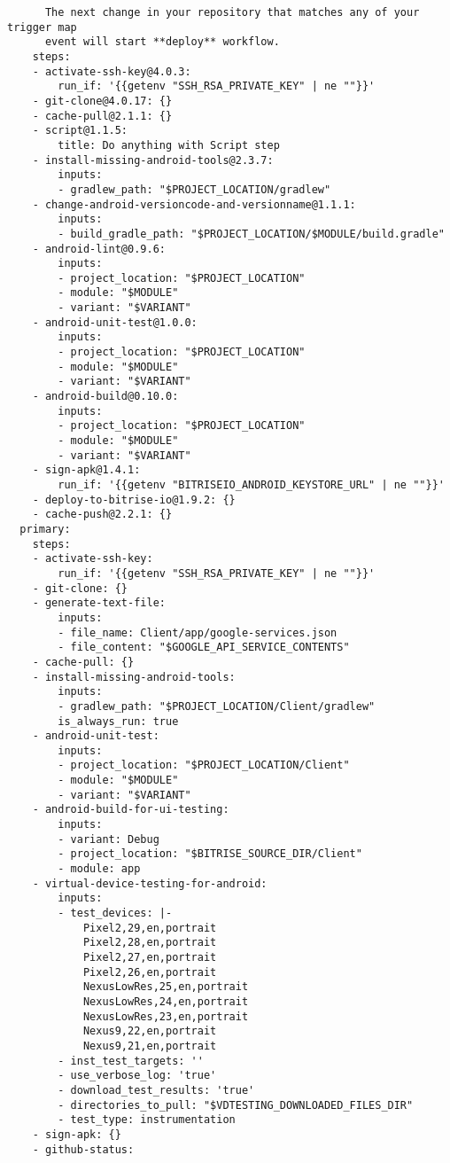 \begin{verbatim}
      The next change in your repository that matches any of your trigger map
      event will start **deploy** workflow.
    steps:
    - activate-ssh-key@4.0.3:
        run_if: '{{getenv "SSH_RSA_PRIVATE_KEY" | ne ""}}'
    - git-clone@4.0.17: {}
    - cache-pull@2.1.1: {}
    - script@1.1.5:
        title: Do anything with Script step
    - install-missing-android-tools@2.3.7:
        inputs:
        - gradlew_path: "$PROJECT_LOCATION/gradlew"
    - change-android-versioncode-and-versionname@1.1.1:
        inputs:
        - build_gradle_path: "$PROJECT_LOCATION/$MODULE/build.gradle"
    - android-lint@0.9.6:
        inputs:
        - project_location: "$PROJECT_LOCATION"
        - module: "$MODULE"
        - variant: "$VARIANT"
    - android-unit-test@1.0.0:
        inputs:
        - project_location: "$PROJECT_LOCATION"
        - module: "$MODULE"
        - variant: "$VARIANT"
    - android-build@0.10.0:
        inputs:
        - project_location: "$PROJECT_LOCATION"
        - module: "$MODULE"
        - variant: "$VARIANT"
    - sign-apk@1.4.1:
        run_if: '{{getenv "BITRISEIO_ANDROID_KEYSTORE_URL" | ne ""}}'
    - deploy-to-bitrise-io@1.9.2: {}
    - cache-push@2.2.1: {}
  primary:
    steps:
    - activate-ssh-key:
        run_if: '{{getenv "SSH_RSA_PRIVATE_KEY" | ne ""}}'
    - git-clone: {}
    - generate-text-file:
        inputs:
        - file_name: Client/app/google-services.json
        - file_content: "$GOOGLE_API_SERVICE_CONTENTS"
    - cache-pull: {}
    - install-missing-android-tools:
        inputs:
        - gradlew_path: "$PROJECT_LOCATION/Client/gradlew"
        is_always_run: true
    - android-unit-test:
        inputs:
        - project_location: "$PROJECT_LOCATION/Client"
        - module: "$MODULE"
        - variant: "$VARIANT"
    - android-build-for-ui-testing:
        inputs:
        - variant: Debug
        - project_location: "$BITRISE_SOURCE_DIR/Client"
        - module: app
    - virtual-device-testing-for-android:
        inputs:
        - test_devices: |-
            Pixel2,29,en,portrait
            Pixel2,28,en,portrait
            Pixel2,27,en,portrait
            Pixel2,26,en,portrait
            NexusLowRes,25,en,portrait
            NexusLowRes,24,en,portrait
            NexusLowRes,23,en,portrait
            Nexus9,22,en,portrait
            Nexus9,21,en,portrait
        - inst_test_targets: ''
        - use_verbose_log: 'true'
        - download_test_results: 'true'
        - directories_to_pull: "$VDTESTING_DOWNLOADED_FILES_DIR"
        - test_type: instrumentation
    - sign-apk: {}
    - github-status:

\end{verbatim}

